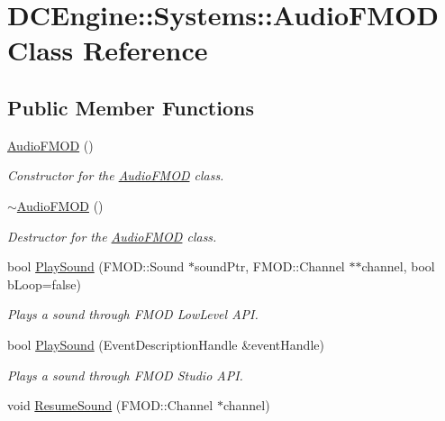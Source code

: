 \hypertarget{classDCEngine_1_1Systems_1_1AudioFMOD}{\section{D\-C\-Engine\-:\-:Systems\-:\-:Audio\-F\-M\-O\-D Class Reference}
\label{classDCEngine_1_1Systems_1_1AudioFMOD}
}
\subsection*{Public Member Functions}
\begin{DoxyCompactItemize}
\item 
\hypertarget{classDCEngine_1_1Systems_1_1AudioFMOD_a3a8be3ba9ed7e0c0b7115537050f21fd}{\hyperlink{classDCEngine_1_1Systems_1_1AudioFMOD_a3a8be3ba9ed7e0c0b7115537050f21fd}{Audio\-F\-M\-O\-D} ()}\label{classDCEngine_1_1Systems_1_1AudioFMOD_a3a8be3ba9ed7e0c0b7115537050f21fd}

\begin{DoxyCompactList}\small\item\em Constructor for the \hyperlink{classDCEngine_1_1Systems_1_1AudioFMOD}{Audio\-F\-M\-O\-D} class. \end{DoxyCompactList}\item 
\hypertarget{classDCEngine_1_1Systems_1_1AudioFMOD_ab67b73b6e40b905d950877d1488eb818}{\hyperlink{classDCEngine_1_1Systems_1_1AudioFMOD_ab67b73b6e40b905d950877d1488eb818}{$\sim$\-Audio\-F\-M\-O\-D} ()}\label{classDCEngine_1_1Systems_1_1AudioFMOD_ab67b73b6e40b905d950877d1488eb818}

\begin{DoxyCompactList}\small\item\em Destructor for the \hyperlink{classDCEngine_1_1Systems_1_1AudioFMOD}{Audio\-F\-M\-O\-D} class. \end{DoxyCompactList}\item 
bool \hyperlink{classDCEngine_1_1Systems_1_1AudioFMOD_aa358e0e8578e3b97657fc3e403ee743f}{Play\-Sound} (F\-M\-O\-D\-::\-Sound $\ast$sound\-Ptr, F\-M\-O\-D\-::\-Channel $\ast$$\ast$channel, bool b\-Loop=false)
\begin{DoxyCompactList}\small\item\em Plays a sound through F\-M\-O\-D Low\-Level A\-P\-I. \end{DoxyCompactList}\item 
bool \hyperlink{classDCEngine_1_1Systems_1_1AudioFMOD_a98a45e720b40a3dfa75846b368fa5b4e}{Play\-Sound} (Event\-Description\-Handle \&event\-Handle)
\begin{DoxyCompactList}\small\item\em Plays a sound through F\-M\-O\-D Studio A\-P\-I. \end{DoxyCompactList}\item 
\hypertarget{classDCEngine_1_1Systems_1_1AudioFMOD_a117772d95e7b83324a03f83e5e4b5b40}{void \hyperlink{classDCEngine_1_1Systems_1_1AudioFMOD_a117772d95e7b83324a03f83e5e4b5b40}{Resume\-Sound} (F\-M\-O\-D\-::\-Channel $\ast$channel)}\label{classDCEngine_1_1Systems_1_1AudioFMOD_a117772d95e7b83324a03f83e5e4b5b40}


\end{DoxyCompactItemize}
